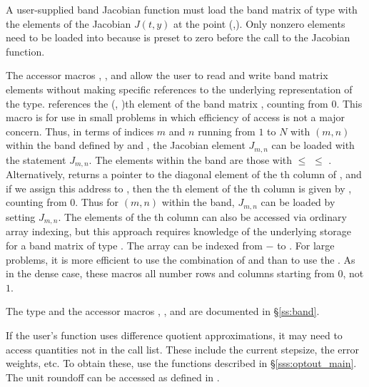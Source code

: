 {
  A user-supplied band Jacobian function must load the band matrix 
  of type  with the elements of the Jacobian $J(t,y)$ at the
  point (,).  Only nonzero elements need to be loaded into
   because  is preset to zero before the call to the
  Jacobian function.  

  The accessor macros , , and  
  allow the user to read and write band matrix elements without making specific 
  references to the underlying representation of the  type.
   references the (, )th element of the 
  band matrix , counting from $0$.
  This macro is for use in small problems in which efficiency of access is not
  a major concern.  Thus, in terms of indices $m$ and $n$ running from $1$ to
  $N$ with $(m,n)$ within the band defined by  and
  , the Jacobian element $J_{m,n}$ can be loaded with the 
  statement  $J_{m,n}$. The elements within
  the band are those with  $\le$  $\le$ .
  Alternatively,  returns a pointer to the diagonal element
  of the th column of , and if we assign this address to 
  , then the th element of the th column is
  given by , counting from $0$.
  Thus for $(m,n)$ within the band, $J_{m,n}$ can be loaded by setting 
   
  $J_{m,n}$.  The elements of the th column can also be accessed
  via ordinary array indexing, but this approach requires knowledge of
  the underlying storage for a band matrix of type .  
  The array  can be indexed from $-$ to .
  For large problems, it is more efficient to use the combination of
   and  than to use the
  .  As in the dense case, these macros all number rows
  and columns starting from $0$, not $1$.  

  The  type and the accessor macros , ,
  and  are documented in \S\ref{ss:band}.

  If the user's  function uses difference quotient approximations,
  it may need to access quantities not in the call list. These include the current
  stepsize, the error weights, etc. To obtain these, use the 
  functions described in \S\ref{sss:optout_main}. The unit roundoff can be
  accessed as  defined in .
}

